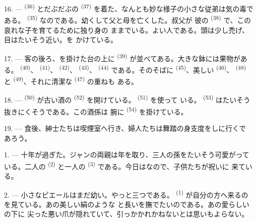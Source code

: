 16. ---  \textsuperscript{(36)} とだぶだぶの
\textsuperscript{(37)} を着た、なんとも妙な様子の小さな従弟は気の毒である。
 \textsuperscript{(35)} なのである。幼くして父と母を亡くした。叔父が
彼の \textsuperscript{(38)} で、この哀れな子を育てるために独り身の
ままでいる。よい人である。頭は少し禿げ、目はたいそう近い。を
かけている。

\VUsaut{2.4mm}
\VUsaut{3.0mm}

17. --- 客の後ろ、を掛けた台の上に
\textsuperscript{(39)} が並べてある。大きな鉢には果物がある。
\textsuperscript{(40)}、 \textsuperscript{(41)}、
\textsuperscript{(42)}、 \textsuperscript{(43)}、
\textsuperscript{(44)} である。そのそばに
\textsuperscript{(45)}、美しい \textsuperscript{(46)}、
 \textsuperscript{(48)} と
\textsuperscript{(49)}、それに清潔な \textsuperscript{(47)} の重ねも
ある。

18. ---  \textsuperscript{(50)} が古い酒の
\textsuperscript{(52)} を開けている。 \textsuperscript{(51)} を使って
いる。 \textsuperscript{(53)} はたいそう抜きにくそうである。この酒係は
腕に \textsuperscript{(54)} を掛けている。

19. --- 食後、紳士たちは喫煙室へ行き、婦人たちは舞踏の身支度をしに行くで
あろう。

\VUsaut{5.0mm}
\VUsaut{1.6mm}
\VUsaut{2.6mm}

\VUsaut{3.0mm}

1. --- 十年が過ぎた。ジャンの両親は年を取り、三人の孫をたいそう可愛がって
いる。二人の \textsuperscript{(2)} と一人の
\textsuperscript{(3)} である。今日はなので、子供たちが祝いに
来ている。

2. --- 小さなピエールはまだ幼い。やっと三つである。
\textsuperscript{(1)} が自分の方へ来るのを見ている。あの美しい絹のような
と長いを撫でたいのである。あの愛らしいの下に
尖った悪い爪が隠れていて、引っかかれかねないとは思いもよらない。

